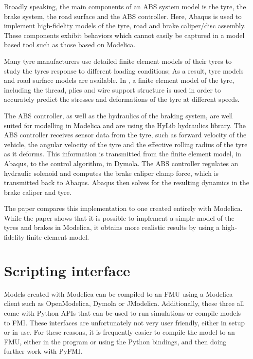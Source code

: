 \documentclass[\rootfolder/main.tex]{subfiles}
\begin{document}
Broadly speaking, the main components of an ABS system model is the tyre, the brake system, the road surface and the ABS controller.
Here, Abaqus is used to implement high-fidelity models of the tyre, road and brake caliper/disc assembly.
These components exhibit behaviors which cannot easily be captured in a model based tool such as those based on Modelica.

Many tyre manufacturers use detailed finite element models of their tyres to study the tyres response to different loading conditions;
As a result, tyre models and road surface models are available.
In \cite{Schofield}, a finite element model of the tyre, including the thread, plies and wire support structure is used in order to accurately predict the stresses and deformations of the tyre at different speeds.

The ABS controller, as well as the hydraulics of the braking system, are well suited for modelling in Modelica and are using the HyLib hydraulics library.
The ABS controller receives sensor data from the tyre, such as forward velocity of the vehicle, the angular velocity of the tyre and the effective rolling radius of the tyre as it deforms.
This information is transmitted from the finite element model, in Abaqus, to the control algorithm, in Dymola.
The ABS controller regulates an hydraulic solenoid and computes the brake caliper clamp force, which is transmitted back to Abaqus.
Abaqus then solves for the resulting dynamics in the brake caliper and tyre.

The paper compares this implementation to one created entirely with Modelica.
While the paper shows that it is possible to implement a simple model of the tyres and brakes in Modelica, it obtains more realistic results by using a high-fidelity finite element model.

\section{Scripting interface}

Models created with Modelica can be compiled to an FMU using a Modelica client such as OpenModelica, Dymola or JModelica.
Additionally, these three all come with Python APIs that can be used to run simulations or compile models to FMI.
These interfaces are unfortunately not very user friendly, either in setup or in use.
For these reasons, it is frequently easier to compile the model to an FMU, either in the program or using the Python bindings, and then doing further work with PyFMI.
\end{document}
